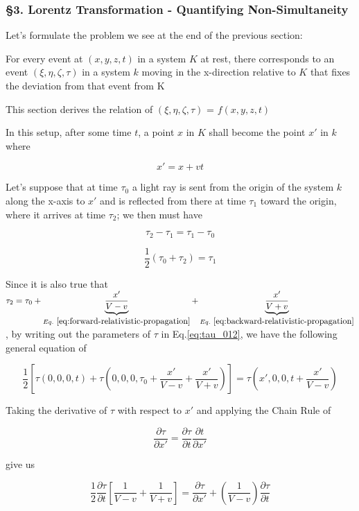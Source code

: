 \subsubsection{\hfil \S3. Lorentz Transformation - Quantifying Non-Simultaneity \hfil}

Let's formulate the problem we see at the end of the previous section:

For every event at $(x, y, z, t)$ in a system $K$ at rest, there corresponds to an event $(\xi, \eta, \zeta, \tau)$ in
a system $k$ moving in the x-direction relative to $K$ that fixes the deviation from that event from K

This section derives the relation of $(\xi, \eta, \zeta, \tau)$ = $f(x, y, z, t)$

In this setup, after some time $t$, a point $x$ in $K$ shall become the point $x'$ in $k$ where

\[
    x' = x + vt
\]

Let's suppose that at time $\tau_0$ a light ray is sent from the origin of the system $k$ along the x-axis to $x'$ and
is reflected from there at time $\tau_1$ toward the origin, where it arrives at time $\tau_2$; we then must have

\[
    \tau_2 - \tau_1 = \tau_1 - \tau_0
\]

\begin{equation} \label{eq:tau_012}
    \frac{1}{2}(\tau_0 + \tau_2) = \tau_1
\end{equation}

Since it is also true that
$\tau_2 = \tau_0 + \underbrace{\frac{x'}{V - v}}_{Eq.~\ref{eq:forward-relativistic-propagation}} + \underbrace{\frac{x'}{V + v}}_{Eq.~\ref{eq:backward-relativistic-propagation}}$,
by writing out the parameters of $\tau$ in Eq.\ref{eq:tau_012}, we have the following general equation of

\begin{equation}
    \frac{1}{2}\left[ \tau(0, 0, 0, t) + \tau\left( 0, 0, 0, \tau_0 + \frac{x'}{V - v} + \frac{x'}{V + v} \right) \right] = \tau\left( x', 0, 0, t + \frac{x'}{V -v} \right)
\end{equation}

Taking the derivative of $\tau$ with respect to $x'$ and applying the Chain Rule of

\[
    \frac{\partial\tau}{\partial x'} = \frac{\partial\tau}{\partial t}\frac{\partial t}{\partial x'}
\]

give us

\begin{equation}
    \frac{1}{2}\frac{\partial\tau}{\partial t}\left[ \frac{1}{V - v} + \frac{1}{V + v} \right] = \frac{\partial\tau}{\partial x'} + \left( \frac{1}{V - v} \right)\frac{\partial\tau}{\partial t}
\end{equation}

